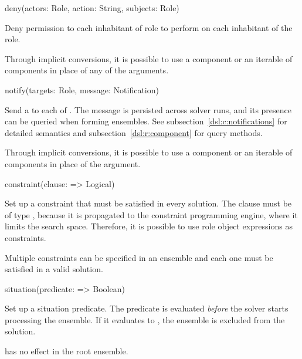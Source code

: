 \pagebreak
\begin{dslsig}
deny(actors: Role, action: String, subjects: Role)
\end{dslsig}
\begin{dsldesc}
    Deny permission to each inhabitant of  role to perform  on
    each inhabitant of the  role.

    Through implicit conversions, it is possible to use a component or an iterable of
    components in place of any of the  arguments.
\end{dsldesc}

\begin{dslsig}
notify(targets: Role, message: Notification)
\end{dslsig}
\begin{dsldesc}
    Send a  to each of . The message is persisted
    across solver runs, and its presence can be queried when forming ensembles. See
    subsection~\ref{dsl:c:notifications} for detailed semantics and
    subsection~\ref{dsl:r:component} for query methods.

    Through implicit conversions, it is possible to use a component or an iterable of
    components in place of the  argument.
\end{dsldesc}

\begin{dslsig}
constraint(clause: => Logical)
\end{dslsig}
\begin{dsldesc}
    Set up a constraint that must be satisfied in every solution. The clause must be of
    type , because it is propagated to the constraint programming
    engine, where it limits the search space. Therefore, it is possible to use role
    object expressions as constraints.

    Multiple constraints can be specified in an ensemble and each one must be satisfied
    in a valid solution.
\end{dsldesc}

\begin{dslsig}
situation(predicate: => Boolean)
\end{dslsig}
\begin{dsldesc}
    Set up a situation predicate. The predicate is evaluated \textit{before} the solver
    starts processing the ensemble. If it evaluates to , the ensemble
    is excluded from the solution.

     has no effect in the root ensemble.
\end{dsldesc}

